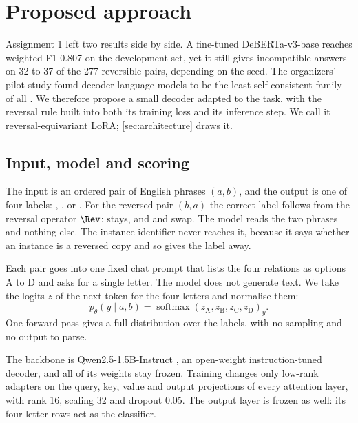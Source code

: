 \section{Proposed approach}
\label{sec:approach}

Assignment 1 left two results side by side. A fine-tuned DeBERTa-v3-base reaches weighted F1 0.807 on the development set, yet it still gives incompatible answers on 32 to 37 of the 277 reversible pairs, depending on the seed. The organizers' pilot study found decoder language models to be the least self-consistent family of all \citep{apaolaza-larraya-etal-2026-assessing}. We therefore propose a small decoder adapted to the task, with the reversal rule built into both its training loss and its inference step. We call it reversal-equivariant LoRA; \cref{sec:architecture} draws it.

\subsection{Input, model and scoring}

The input is an ordered pair of English phrases $(a,b)$, and the output is one of four labels: \EQ{}, \FW{}, \BW{} or \NO{}. For the reversed pair $(b,a)$ the correct label follows from the reversal operator $\Rev$: \EQ{} stays, and \FW{} and \BW{} swap. The model reads the two phrases and nothing else. The instance identifier never reaches it, because it says whether an instance is a reversed copy and so gives the label away.

Each pair goes into one fixed chat prompt that lists the four relations as options A to D and asks for a single letter. The model does not generate text. We take the logits $z$ of the next token for the four letters and normalise them:
\begin{equation}
p_\theta(y \mid a,b) = \operatorname{softmax}(z_{\mathrm{A}}, z_{\mathrm{B}}, z_{\mathrm{C}}, z_{\mathrm{D}})_y .
\end{equation}
One forward pass gives a full distribution over the labels, with no sampling and no output to parse.

The backbone is Qwen2.5-1.5B-Instruct \citep{qwen2025qwen25technicalreport}, an open-weight instruction-tuned decoder, and all of its weights stay frozen. Training changes only low-rank adapters \citep{hu-etal-2022-lora} on the query, key, value and output projections of every attention layer, with rank 16, scaling 32 and dropout 0.05. The output layer is frozen as well: its four letter rows act as the classifier.


